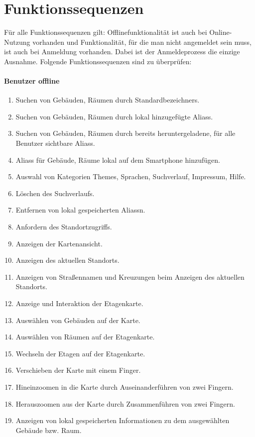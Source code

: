 \section{Funktionssequenzen}

Für alle Funktionssequenzen gilt:
Offlinefunktionalität ist auch bei Online-Nutzung vorhanden und Funktionalität, für die man nicht angemeldet sein muss, ist auch bei Anmeldung vorhanden. Dabei ist der Anmeldeprozess die einzige Ausnahme.
Folgende Funktionssequenzen sind zu überprüfen:

\paragraph{\Gls{Benutzer} offline}
\begin{enumerate}[label=\textbf{/T\arabic*0/}, align=left]
	\item Suchen von Gebäuden, Räumen durch \Glspl{Standardbezeichner}.
	\item Suchen von Gebäuden, Räumen durch \gls{lokal} hinzugefügte \Glspl{Alias}.
	\item Suchen von Gebäuden, Räumen durch bereits heruntergeladene, für alle Benutzer sichtbare \Glspl{Alias}.
	\item \Glspl{Alias} für Gebäude, Räume \gls{lokal} auf dem Smartphone hinzufügen.
	\item Auswahl von Kategorien \Glspl{Theme}, Sprachen, Suchverlauf, Impressum, Hilfe.
	\item Löschen des Suchverlaufs.
	\item Entfernen von \gls{lokal} gespeicherten \Glspl{Alias}n.
	\item Anfordern des Standortzugriffs.
	\item Anzeigen der \Gls{Kartenansicht}.
	\item Anzeigen des aktuellen Standorts.
	\item Anzeigen von Straßennamen und Kreuzungen beim Anzeigen des aktuellen Standorts.
	\item Anzeige und Interaktion der \Gls{Etagenkarte}.
	\item Auswählen von Gebäuden auf der \Gls{Karte}.
	\item Auswählen von Räumen auf der \Gls{Etagenkarte}.
	\item Wechseln der Etagen auf der \Gls{Etagenkarte}.
	\item Verschieben der \Gls{Karte} mit einem Finger.
	\item Hineinzoomen in die \Gls{Karte} durch Auseinanderführen von zwei Fingern.
	\item Herauszoomen aus der \Gls{Karte} durch Zusammenführen von zwei Fingern.
	\item Anzeigen von \gls{lokal} gespeicherten Informationen zu dem ausgewählten Gebäude bzw. Raum.
\end{enumerate}

